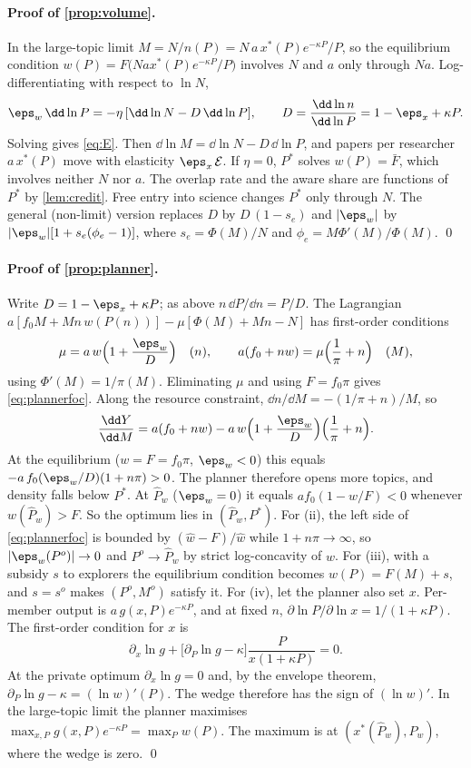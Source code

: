 \paragraph{Proof of \cref{prop:volume}.} In the large-topic limit
$M=N/n(P)=N\,a\,x^*(P)e^{-\kappa P}/P$, so the equilibrium condition
$w(P)=F\big(N a x^*(P)e^{-\kappa P}/P\big)$ involves $N$ and $a$ only through
$Na$. Log-differentiating with respect to $\ln N$,
\[
\eps_w\,\dd\ln P=-\eta\,[\dd\ln N-D\,\dd\ln P],\qquad D=\frac{\dd\ln n}{\dd\ln P}=1-\eps_x+\kappa P .
\]
Solving gives \eqref{eq:E}. Then $\dd\ln M=\dd\ln N-D\,\dd\ln P$, and papers per
researcher $a\,x^*(P)$ move with elasticity $\eps_x\,\mathcal E$. If $\eta=0$,
$P^*$ solves $w(P)=\bar F$, which involves neither $N$ nor $a$. The overlap rate
and the aware share are functions of $P^*$ by \cref{lem:credit}. Free entry into
science changes $P^*$ only through $N$. The general (non-limit) version
replaces $D$ by $D\,(1-s_e)$ and $|\eps_w|$ by $|\eps_w|[1+s_e(\phi_e-1)]$,
where $s_e=\Phi(M)/N$ and $\phi_e=M\Phi'(M)/\Phi(M)$. \qed

\paragraph{Proof of \cref{prop:planner}.} Write $D=1-\eps_x+\kappa P$; as
above $n\,\dd P/\dd n=P/D$. The Lagrangian
$a[f_0M+Mn\,w(P(n))]-\mu[\Phi(M)+Mn-N]$ has first-order conditions
\[
\mu=a\,w\Big(1+\frac{\eps_w}{D}\Big)\quad(n),\qquad a(f_0+nw)=\mu\Big(\frac1{\pi}+n\Big)\quad(M),
\]
using $\Phi'(M)=1/\pi(M)$. Eliminating $\mu$ and using $F=f_0\pi$ gives
\eqref{eq:plannerfoc}. Along the resource constraint,
$\dd n/\dd M=-(1/\pi+n)/M$, so
\[
\frac{\dd Y}{\dd M}=a(f_0+nw)-a\,w\Big(1+\frac{\eps_w}{D}\Big)\Big(\frac1\pi+n\Big).
\]
At the equilibrium ($w=F=f_0\pi$, $\eps_w<0$) this equals
$-a\,f_0(\eps_w/D)(1+n\pi)>0$. The planner therefore opens more topics, and
density falls below $P^*$. At $\hat P_w$ ($\eps_w=0$) it equals
$a f_0(1-w/F)<0$ whenever $w(\hat P_w)>F$. So the optimum lies in
$(\hat P_w,P^*)$. For (ii), the left side of \eqref{eq:plannerfoc} is bounded
by $(\hat w-F)/\hat w$ while $1+n\pi\to\infty$,
so $|\eps_w(P^o)|\to0$ and $P^o\to\hat P_w$ by strict log-concavity of $w$. For
(iii), with a subsidy $s$ to explorers the equilibrium condition becomes
$w(P)=F(M)+s$, and $s=s^o$ makes $(P^o,M^o)$ satisfy it. For (iv), let the
planner also set $x$. Per-member output is $a\,g(x,P)e^{-\kappa P}$, and at
fixed $n$, $\partial\ln P/\partial\ln x=1/(1+\kappa P)$. The first-order
condition for $x$ is
\[
\partial_x\ln g+\big[\partial_P\ln g-\kappa\big]\frac{P}{x(1+\kappa P)}=0 .
\]
At the private optimum $\partial_x\ln g=0$ and, by the envelope theorem,
$\partial_P\ln g-\kappa=(\ln w)'(P)$. The wedge therefore has the sign of
$(\ln w)'$. In the large-topic limit the planner maximises $\max_{x,P}g(x,P)e^{-\kappa P}=\max_P w(P)$. The maximum is at $(x^*(\hat P_w),\hat P_w)$, where the wedge is zero. \qed

